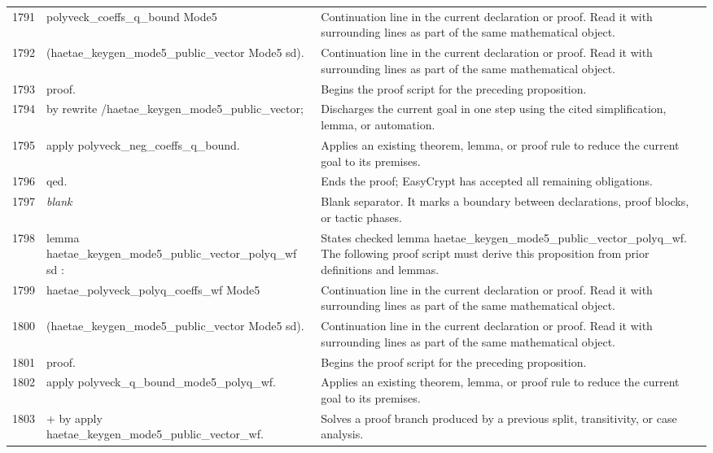 \documentclass[10pt]{article}
\begin{document}
\begin{longtable}{r L{0.53\textwidth} L{0.37\textwidth}}
1791 & {\ttfamily\scriptsize   polyveck\_coeffs\_q\_bound Mode5} & Continuation line in the current declaration or proof.  Read it with surrounding lines as part of the same mathematical object. \\
1792 & {\ttfamily\scriptsize     (haetae\_keygen\_mode5\_public\_vector Mode5 sd).} & Continuation line in the current declaration or proof.  Read it with surrounding lines as part of the same mathematical object. \\
1793 & {\ttfamily\scriptsize proof.} & Begins the proof script for the preceding proposition. \\
1794 & {\ttfamily\scriptsize by rewrite /haetae\_keygen\_mode5\_public\_vector;} & Discharges the current goal in one step using the cited simplification, lemma, or automation. \\
1795 & {\ttfamily\scriptsize    apply polyveck\_neg\_coeffs\_q\_bound.} & Applies an existing theorem, lemma, or proof rule to reduce the current goal to its premises. \\
1796 & {\ttfamily\scriptsize qed.} & Ends the proof; EasyCrypt has accepted all remaining obligations. \\
1797 & {\ttfamily\scriptsize \emph{blank}} & Blank separator.  It marks a boundary between declarations, proof blocks, or tactic phases. \\
1798 & {\ttfamily\scriptsize lemma haetae\_keygen\_mode5\_public\_vector\_polyq\_wf sd :} & States checked lemma haetae\_keygen\_mode5\_public\_vector\_polyq\_wf.  The following proof script must derive this proposition from prior definitions and lemmas. \\
1799 & {\ttfamily\scriptsize   haetae\_polyveck\_polyq\_coeffs\_wf Mode5} & Continuation line in the current declaration or proof.  Read it with surrounding lines as part of the same mathematical object. \\
1800 & {\ttfamily\scriptsize     (haetae\_keygen\_mode5\_public\_vector Mode5 sd).} & Continuation line in the current declaration or proof.  Read it with surrounding lines as part of the same mathematical object. \\
1801 & {\ttfamily\scriptsize proof.} & Begins the proof script for the preceding proposition. \\
1802 & {\ttfamily\scriptsize apply polyveck\_q\_bound\_mode5\_polyq\_wf.} & Applies an existing theorem, lemma, or proof rule to reduce the current goal to its premises. \\
1803 & {\ttfamily\scriptsize + by apply haetae\_keygen\_mode5\_public\_vector\_wf.} & Solves a proof branch produced by a previous split, transitivity, or case analysis. \\

\end{longtable}
\end{document}
